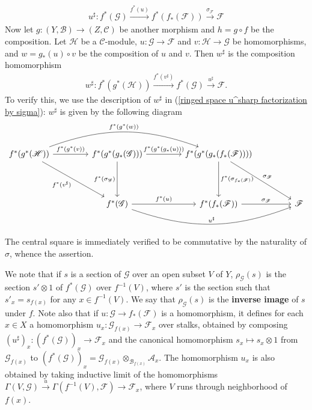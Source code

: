 \begin{align}\label{ringed space u^sharp factorization by sigma}
u^{\sharp}:f^*(\mathscr{G})\stackrel{f^*(u)}{\to}f^*(f_*(\mathscr{F}))\stackrel{\sigma_{\mathscr{F}}}{\to}\mathscr{F}
\end{align}
Now let $g:(Y,\mathscr{B})\to(Z,\mathscr{C})$ be another morphism and $h=g\circ f$ be the composition. Let $\mathscr{H}$ be a $\mathscr{C}$-module, $u:\mathscr{G}\to\mathscr{F}$ and $v:\mathscr{H}\to\mathscr{G}$ be homomorphisms, and $w=g_*(u)\circ v$ be the composition of $u$ and $v$. Then $w^{\sharp}$ is the composition homomorphism
\begin{align}\label{ringed space sharp of a composition}
w^{\sharp}:f^*(g^*(\mathscr{H}))\stackrel{f^*(v^{\sharp})}{\to}f^*(\mathscr{G})\stackrel{u^{\sharp}}{\to}\mathscr{F}.  
\end{align}
To verify this, we use the description of $w^{\sharp}$ in (\ref{ringed space u^sharp factorization by sigma}): $w^{\sharp}$ is given by the following diagram
\[\begin{tikzcd}[column sep=15mm,row sep=15mm]
f^*(g^*(\mathscr{H}))\ar[rr,bend left=20pt,"f^*(g^*(w))"]\ar[rd,swap,"f^*(v^{\sharp})"]\ar[r,"f^*(g^*(v))"]&f^*(g^*(g_*(\mathscr{G})))\ar[d,swap,"f^*(\sigma_{\mathscr{G}})"]\ar[r,"f^*(g^*(g_*(u)))"]&f^*(g^*(g_*(f_*(\mathscr{F}))))\ar[d,"f^*(\sigma_{f_*(\mathscr{F})})"]\ar[rd,"\sigma_{\mathscr{F}}"]&\\
&f^*(\mathscr{G})\ar[rr,bend right=20pt,"u^{\sharp}"]\ar[r,"f^*(u)"]&f^*(f_*(\mathscr{F}))\ar[r,"\sigma_{\mathscr{F}}"]&\mathscr{F}
\end{tikzcd}\]
The central square is immediately verified to be commutative by the naturality of $\sigma$, whence the assertion.\par
We note that if $s$ is a section of $\mathscr{G}$ over an open subset $V$ of $Y$, $\rho_{\mathscr{G}}(s)$ is the section $s'\otimes 1$ of $f^*(\mathscr{G})$ over $f^{-1}(V)$, where $s'$ is the section such that $s'_x=s_{f(x)}$ for any $x\in f^{-1}(V)$. We say that $\rho_{\mathscr{G}}(s)$ is the \textbf{inverse image} of $s$ under $f$. Note also that if $u:\mathscr{G}\to f_*(\mathscr{F})$ is a homomorphism, it defines for each $x\in X$ a homomorphism $u_x:\mathscr{G}_{f(x)}\to\mathscr{F}_x$ over stalks, obtained by composing $(u^{\sharp})_x:(f^*(\mathscr{G}))_x\to\mathscr{F}_x$ and the canonical homomorphism $s_x\mapsto s_x\otimes 1$ from $\mathscr{G}_{f(x)}$ to $(f^*(\mathscr{G}))_x=\mathscr{G}_{f(x)}\otimes_{\mathscr{B}_{f(x)}}\mathscr{A}_x$. The homomorphism $u_x$ is also obtained by taking inductive limit of the homomorphisms $\Gamma(V,\mathscr{G})\stackrel{u}{\to}\Gamma(f^{-1}(V),\mathscr{F})\to\mathscr{F}_x$, where $V$ runs through neighborhood of $f(x)$.\par
